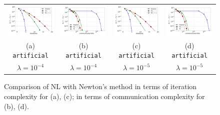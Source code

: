 \documentclass[12pt]{article}
\begin{document}
\begin{figure}[t]
	\vskip 0.2in
	\begin{center}
		\begin{tabular}{cccc}
			\includegraphics[width = 0.23 \textwidth]{LogReg/artificial/Lambda=1e-4/NL_newton_iter_art_lmb=0_0001.pdf}&
			\includegraphics[width = 0.23 \textwidth]{LogReg/artificial/Lambda=1e-4/NL_newton_bits_art_lmb=0_0001.pdf}&	
			\includegraphics[width = 0.23 \textwidth]{LogReg/artificial/Lambda=1e-5/NL_newton_iter_art_lmb=0_00001.pdf}&
			\includegraphics[width = 0.23 \textwidth]{LogReg/artificial/Lambda=1e-5/NL_newton_bits_art_lmb=0_00001.pdf}\\
			(a) {\tt artificial} & (b) {\tt artificial} & (c) {\tt artificial} & (d) {\tt artificial}\\
			$\lambda=10^{-4}$ & $\lambda=10^{-4}$ & $\lambda=10^{-5}$ & $\lambda=10^{-5}$\\
		\end{tabular}
		\caption{Comparison of {\sf NL} with Newton's method in terms of iteration complexity for (a), (c); in terms of communication complexity for (b), (d).}
		\label{a9a:alg1_alg2}
	\end{center}
\end{figure}
\end{document}
